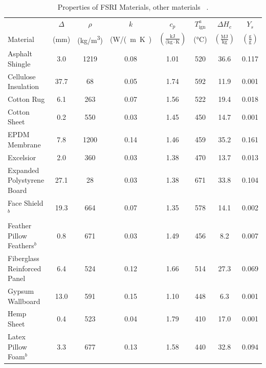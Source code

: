 \begin{table}[!h]
\caption[Properties of FSRI Materials, other materials]{Properties of FSRI Materials, other materials ~\cite{McKinnon:FSRI2023_Data}.}
\centering
\begin{tabular}{|p{6.5cm}|c|c|c|c|c|c|c|}
\hline
            & $\Delta$& $\rho$& $k$& $c_{p}$ &$T_{\mathrm{ign}}^{a}$&$\Delta H_{c}$& $Y_{s}$ \\
Material    & (mm) & (\unit{kg/m^3}) & (\unit{W/(m.K)} & $\mathrm{\left(\frac{kJ}{(kg\cdot K}\right)}$ & (\unit{\degreeCelsius})   & $\left(\mathrm{\frac{MJ}{kg}}\right)$ & $\mathrm{\left(\frac{g}{g}\right)}$ \\ \hline
\hline
Asphalt Shingle                                   & 3.0  & 1219 & 0.08 & 1.01 & 520 & 36.6 & 0.117 \\\hline
Cellulose Insulation                              & 37.7 & 68   & 0.05 & 1.74 & 592 & 11.9 & 0.001 \\\hline
Cotton Rug                                        & 6.1  & 263  & 0.07 & 1.56 & 522 & 19.4 & 0.018 \\\hline
Cotton Sheet                                      & 0.2  & 550  & 0.03 & 1.45 & 450 & 14.7 & 0.001 \\\hline
EPDM Membrane                                     & 7.8  & 1200 & 0.14 & 1.46 & 459 & 35.2 & 0.161 \\\hline
Excelsior                                         & 2.0  & 360  & 0.03 & 1.38 & 470 & 13.7 & 0.013 \\\hline
Expanded Polystyrene Board                        & 27.1 & 28   & 0.03 & 1.38 & 671 & 33.8 & 0.104 \\\hline
Face Shield$^{b}$                                 & 19.3 & 664  & 0.07 & 1.35 & 578 & 14.1 & 0.002 \\\hline
Feather Pillow Feathers$^{b}$                     & 0.8  & 671  & 0.03 & 1.49 & 456 & 8.2  & 0.007 \\\hline
Fiberglass Reinforced Panel                       & 6.4  & 524  & 0.12 & 1.66 & 514 & 27.3 & 0.069 \\\hline
Gypsum Wallboard                                  & 13.0 & 591  & 0.15 & 1.10 & 448 & 6.3  & 0.001 \\\hline
Hemp Sheet                                        & 0.4  & 523  & 0.04 & 1.79 & 410 & 17.0 & 0.001 \\\hline
Latex Pillow Foam$^{b}$                           & 3.3  & 677  & 0.13 & 1.58 & 440 & 32.8 & 0.094 \\\hline

\end{tabular}
\end{table}
